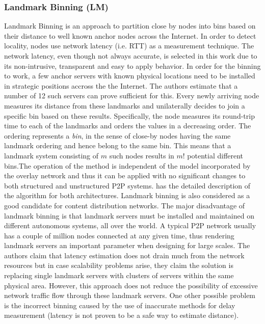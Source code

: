\subsubsection{Landmark Binning (LM)}\label{sec:landmark_binning}

Landmark Binning \cite{RHMKS2002} is an approach to partition close
by nodes into bins based on their distance to well known anchor nodes across the
Internet.%
In order to detect locality, nodes use network latency (i.e. RTT) as a
measurement technique. The network latency, even though not always accurate, is
selected in this work due to its non-intrusive, transparent and easy to apply
behavior. In order for the binning to work, a few anchor servers with known
physical locations need to be installed in strategic positions accross the the
Internet. The authors estimate that a number of 12 such servers can prove sufficient
for this. Every newly arriving node measures its distance from these landmarks
and unilaterally decides to join a specific bin based on these results.
Specifically, the node measures its round-trip time to each of the landmarks and
orders the values in a decreasing order. The ordering represents a \emph{bin},
in the sense of close-by nodes having the same landmark ordering and hence
belong to the same bin. This means that a landmark system consisting of $m$ such
nodes results in $m!$ potential different bins.The operation of the method is
independent of the model incorporated by the overlay network and thus it can be
applied with no significant changes to both structured and unstructured P2P
systems. \cite{RHMKS2002} has the detailed description of the algorithm for
both architectures. Landmark binning is also considered as a good candidate for
content distribution networks. The major disadvantage of landmark
binning is that landmark servers must be installed and maintained
on different autonomous
systems, all over the world. A typical P2P network usually has a couple of
million nodes connected at any given time, thus rendering landmark servers an
important parameter when designing for large scales.  The authors claim that
latency estimation does not drain much from the network resources but in case
scalability problems arise, they claim the solution is replacing single landmark
servers with clusters of servers within the same physical area. However, this
approach does not reduce the possibility of excessive network traffic flow
through these landmark servers. One other possible problem is the incorrect
binning caused by the use of inaccurate methods for delay measurement
(latency is not proven to be a safe way to estimate distance).

